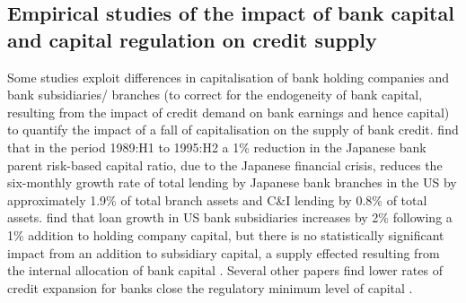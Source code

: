 \documentclass[
]{article}
\begin{document}
\hypertarget{empirical-studies-of-the-impact-of-bank-capital-and-capital-regulation-on-credit-supply}{%
\subsection{Empirical studies of the impact of bank capital and capital regulation on credit supply}\label{empirical-studies-of-the-impact-of-bank-capital-and-capital-regulation-on-credit-supply}}

Some studies exploit differences in capitalisation of bank holding companies and bank subsidiaries/ branches (to correct for the endogeneity of bank capital, resulting from the impact of credit demand on bank earnings and hence capital) to quantify the impact of a fall of capitalisation on the supply of bank credit. \citet{peek1997international} find that in the period 1989:H1 to 1995:H2 a 1\% reduction in the Japanese bank parent risk-based capital ratio, due to the Japanese financial crisis, reduces the six-monthly growth rate of total lending by Japanese bank branches in the US by approximately 1.9\% of total branch assets and C\&I lending by 0.8\% of total assets. \citet{houston1997capital} find that loan growth in US bank subsidiaries increases by 2\% following a 1\% addition to holding company capital, but there is no statistically significant impact from an addition to subsidiary capital, a supply effected resulting from the internal allocation of bank capital \citep[see,][ on losses in the 1930s]{calomiris2003fundamentals, calomiris1998bank}. Several other papers find lower rates of credit expansion for banks close the regulatory minimum level of capital \citep[see,][]{hancock1994bank, berger1994lines, nier2005bank, van2008welfare, gambacorta2004does, berrospide2010effects}.
\end{document}
